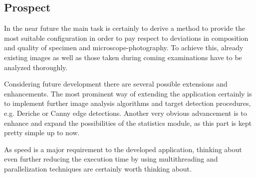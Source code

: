 \documentclass[a4paper, 12pt]{article}
\begin{document}
\subsection{Prospect}
In the near future the main task is certainly to derive a method to provide the
most suitable configuration in order to pay respect to deviations in
composition and quality of specimen and microscope-photography. To achieve this,
already existing images as well as those taken during coming examinations have
to be analyzed thoroughly.

Considering future development there are several possible extensions and
enhancements. The most prominent way of extending the application certainly is
to implement further image analysis algorithms and target detection procedures,
e.g. Deriche or Canny edge detections. Another very obvious advancement is to
enhance and expand the possibilities of the statistics module, as this part
is kept pretty simple up to now.

As speed is a major requirement to the developed application, thinking about
even further reducing the execution time by using multithreading and
parallelization techniques are certainly worth thinking about.

\newpage
{}

\end{document}
